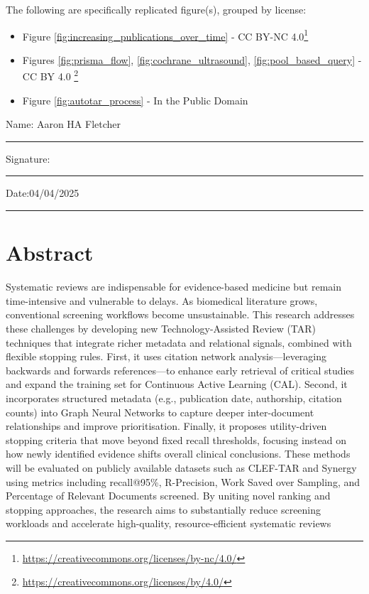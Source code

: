 \documentclass[10pt,oneside]{book}
\begin{document}
The following are specifically replicated figure(s), grouped by license: 

\begin{itemize}
    \item Figure \ref{fig:increasing_publications_over_time} - CC BY-NC 4.0\footnote{\url{https://creativecommons.org/licenses/by-nc/4.0/}}
    \item Figures \ref{fig:prisma_flow}, \ref{fig:cochrane_ultrasound}, \ref{fig:pool_based_query} - CC BY 4.0 \footnote{\url{https://creativecommons.org/licenses/by/4.0/}}
    \item Figure \ref{fig:autotar_process} - In the Public Domain 
\end{itemize}

\vspace{20em}

\noindent Name: Aaron HA Fletcher\\[1mm]
\rule[1em]{25em}{0.5pt}

\noindent Signature:\\[1mm]
\rule[1em]{25em}{0.5pt}

\noindent Date:04/04/2025\\[1mm]
\rule[1em]{25em}{0.5pt}




\chapter*{\Large \center Abstract}


Systematic reviews are indispensable for evidence-based medicine but remain time-intensive and vulnerable to delays. As biomedical literature grows, conventional screening workflows become unsustainable. This research addresses these challenges by developing new Technology-Assisted Review (TAR) techniques that integrate richer metadata and relational signals, combined with flexible stopping rules. First, it uses citation network analysis—leveraging backwards and forwards references—to enhance early retrieval of critical studies and expand the training set for Continuous Active Learning (CAL). Second, it incorporates structured metadata (e.g., publication date, authorship, citation counts) into Graph Neural Networks to capture deeper inter-document relationships and improve prioritisation. Finally, it proposes utility-driven stopping criteria that move beyond fixed recall thresholds, focusing instead on how newly identified evidence shifts overall clinical conclusions. These methods will be evaluated on publicly available datasets such as CLEF-TAR and Synergy using metrics including recall@95\%, R-Precision, Work Saved over Sampling, and Percentage of Relevant Documents screened. By uniting novel ranking and stopping approaches, the research aims to substantially reduce screening workloads and accelerate high-quality, resource-efficient systematic reviews
    \smallskip
    \smallskip
    
\end{document}
